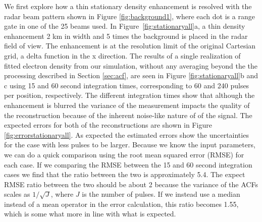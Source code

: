 \documentclass[draft,ras]{agutex}
\begin{document}
\begin{article}
We first explore how a thin stationary density enhancement is resolved with the radar beam pattern shown in Figure \ref{fig:background1}, where each dot is a range gate in one of the 25 beams used. In Figure~\ref{fig:stationaryall}a, a thin density enhancement 2 km in width and 5 times the background is placed in the radar field of view. The enhancement is at the resolution limit of the original Cartesian grid, a delta function in the x direction.  The results of a single realization of fitted electron density from our simulation, without any averaging beyond the the processing described in Section \ref{sec:acf},
are seen in Figure \ref{fig:stationaryall}b and c using 15 and 60 second integration times, corresponding to 60 and 240 pulses per position, respectively. The different integration times show that although the enhancement is blurred the variance of the measurement impacts the quality of the reconstruction because of the inherent noise-like nature of of the signal. The expected errors for both of the reconstructions are shown in Figure \ref{fig:errorstationaryall}. As expected the estimated errors show the uncertainties for the case with less pulses to be larger. 
Because we know the input parameters, we can do a quick comparison using the root mean squared error (RMSE) for each case. If we comparing the RMSE between the 15 and 60 second integration cases we find that the ratio between the two is approximately 5.4. The expect RMSE ratio between the two should be about 2 because the variance of the ACFs scales as $1/\sqrt{J}$, where $J$ is the number of pulses. If we instead use a median instead of a mean operator in the error calculation, this ratio becomes 1.55, which is some what more in line with what is expected.


\end{article}
\end{document}
